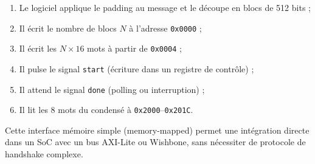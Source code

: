 \begin{enumerate}
    \item Le logiciel applique le padding au message et le découpe en blocs de 512 bits ;
    \item Il écrit le nombre de blocs $N$ à l'adresse \texttt{0x0000} ;
    \item Il écrit les $N \times 16$ mots à partir de \texttt{0x0004} ;
    \item Il pulse le signal \texttt{start} (écriture dans un registre de contrôle) ;
    \item Il attend le signal \texttt{done} (polling ou interruption) ;
    \item Il lit les 8 mots du condensé à \texttt{0x2000}--\texttt{0x201C}.
\end{enumerate}

Cette interface mémoire simple (memory-mapped) permet une intégration directe dans un SoC avec un bus AXI-Lite ou Wishbone, sans nécessiter de protocole de handshake complexe.

